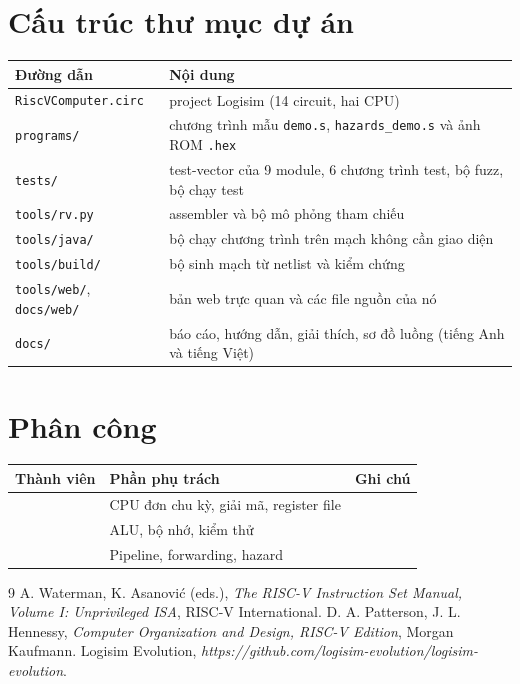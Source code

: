 \documentclass[11pt,a4paper]{article}
\begin{document}
\section{Cấu trúc thư mục dự án}
\begin{center}
\small
\begin{tabularx}{\textwidth}{@{}>{\raggedright\arraybackslash}p{4.6cm}X@{}}
\toprule
\textbf{Đường dẫn} & \textbf{Nội dung}\\
\midrule
\texttt{RiscVComputer.circ} & project Logisim (14 circuit, hai CPU)\\
\texttt{programs/} & chương trình mẫu \texttt{demo.s}, \texttt{hazards\_demo.s} và ảnh ROM \texttt{.hex}\\
\texttt{tests/} & test-vector của 9 module, 6 chương trình test, bộ fuzz, bộ chạy test\\
\texttt{tools/rv.py} & assembler và bộ mô phỏng tham chiếu\\
\texttt{tools/java/} & bộ chạy chương trình trên mạch không cần giao diện\\
\texttt{tools/build/} & bộ sinh mạch từ netlist và kiểm chứng\\
\texttt{tools/web/}, \texttt{docs/web/} & bản web trực quan và các file nguồn của nó\\
\texttt{docs/} & báo cáo, hướng dẫn, giải thích, sơ đồ luồng (tiếng Anh và tiếng Việt)\\
\bottomrule
\end{tabularx}
\end{center}

\section{Phân công}
\begin{center}
\small
\begin{tabularx}{\textwidth}{@{}>{\raggedright\arraybackslash}p{4.2cm}>{\raggedright\arraybackslash}p{5.4cm}X@{}}
\toprule
\textbf{Thành viên} & \textbf{Phần phụ trách} & \textbf{Ghi chú}\\
\midrule
\underline{\hspace{3.6cm}} & CPU đơn chu kỳ, giải mã, register file & \\
\underline{\hspace{3.6cm}} & ALU, bộ nhớ, kiểm thử & \\
\underline{\hspace{3.6cm}} & Pipeline, forwarding, hazard & \\
\bottomrule
\end{tabularx}
\end{center}

\begin{thebibliography}{9}
 A. Waterman, K. Asanović (eds.), \emph{The RISC-V Instruction Set Manual, Volume I: Unprivileged ISA}, RISC-V International.
 D. A. Patterson, J. L. Hennessy, \emph{Computer Organization and Design, RISC-V Edition}, Morgan Kaufmann.
 Logisim Evolution, \emph{https://github.com/logisim-evolution/logisim-evolution}.
\end{thebibliography}
\end{document}
